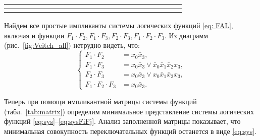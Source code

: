 \begin{landscape}
\begin{table}[]
\begin{tabular}{|c|ccccccccccccccccccccc|}
			\multicolumn{1}{c|}{} &
			\multicolumn{1}{c|}{} &
			\multicolumn{1}{c|}{} &
			\multicolumn{1}{c|}{} &
			\multicolumn{1}{c|}{} &
			\multicolumn{1}{c|}{} &
			\multicolumn{1}{c|}{} &
			\multicolumn{1}{c|}{} &
			\multicolumn{1}{c|}{} &
			\multicolumn{1}{c|}{} &
			\multicolumn{1}{c|}{} &
			\multicolumn{1}{c|}{} &
			\multicolumn{1}{c|}{} &
			\multicolumn{1}{c|}{} &
			\multicolumn{1}{c|}{} &
			\multicolumn{1}{c|}{} &
			\multicolumn{1}{c|}{} &
			\multicolumn{1}{c|}{} &
			\\ \hline
			&
			\multicolumn{1}{c|}{} &
			\multicolumn{1}{c|}{} &
			\multicolumn{1}{c|}{} &
			\multicolumn{1}{c|}{} &
			\multicolumn{1}{c|}{} &
			\multicolumn{1}{c|}{} &
			\multicolumn{1}{c|}{} &
			\multicolumn{1}{c|}{} &
			\multicolumn{1}{c|}{} &
			\multicolumn{1}{c|}{} &
			\multicolumn{1}{c|}{} &
			\multicolumn{1}{c|}{} &
			\multicolumn{1}{c|}{} &
			\multicolumn{1}{c|}{} &
			\multicolumn{1}{c|}{} &
			\multicolumn{1}{c|}{} &
			\multicolumn{1}{c|}{} &
			\multicolumn{1}{c|}{} &
			\multicolumn{1}{c|}{} &
			\multicolumn{1}{c|}{} &
			\\ \hline
		\end{tabular}
	\end{table}
\end{landscape}
\normalsize


Найдем все простые импликанты системы логических функций \eqref{eq: FAL}, включая и функции $F_1\cdot F_2, F_1 \cdot F_3, F_2\cdot F_3, F_1 \cdot F_2 \cdot F_3$. Из диаграмм (рис.~\ref{fig:Veitch_all}) нетрудно видеть, что:
\begin{equation} \label{eq:sysFiFj}
	\left\{
	\begin{aligned}
		F_1\cdot F_2 &= x_0 \bar x_3,\\
		F_1\cdot F_3 &= x_0 \bar x_3 \vee \bar x_0 \bar x_1 \bar x_2 x_3,\\
		F_2\cdot F_3 &= x_0 \bar x_3 \vee x_0 \bar x_1 \bar x_2 x_3,\\
		F_1 \cdot F_2 \cdot F_3 &= x_0 \bar x_3.
	\end{aligned}
	\right.
\end{equation}



Теперь при помощи импликантной матрицы системы функций (табл.~\ref{tab:matrix}) определим минимальное представление системы логических функций \eqref{eq:sys}--\eqref{eq:sysFiFj}. Анализ заполненной матрицы показывает, что минимальная совокупность переключательных функций останется в виде \eqref{eq:sys}.


